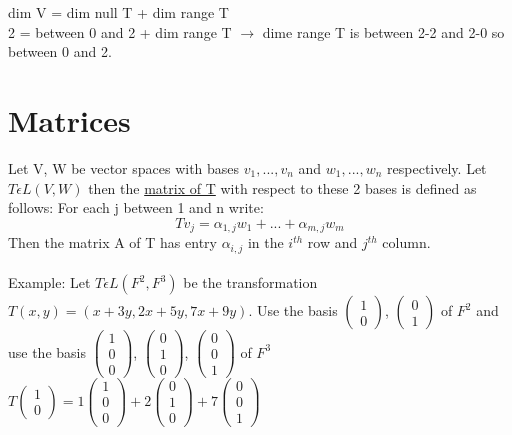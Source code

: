 \documentclass{article}
\begin{document}
dim V = dim null T + dim range T \\
2 = between 0 and 2 + dim range T $\rightarrow$ dime range T is between 2-2 and 2-0 so between 0 and 2.

\section{Matrices} 
Let V, W be vector spaces with bases $v_1, ..., v_n$ and $w_1, ..., w_n$ respectively. Let $T \epsilon L(V,W)$ then the \underline{matrix of T} with respect to these 2 bases is defined as follows: For each j between 1 and n write: $$Tv_j = \alpha_{1,j}w_1 + ... + \alpha_{m,j}w_m$$ Then the matrix A of T has entry $\alpha_{i,j}$ in the $i^{th}$ row and $j^{th}$ column. \\\\
Example: Let $T\epsilon L(F^2, F^3)$ be the transformation $T(x,y) = (x+3y, 2x + 5y, 7x + 9y)$. Use the basis $\begin{pmatrix} 1 \\ 0 \end{pmatrix}$, $\begin{pmatrix} 0 \\ 1 \end{pmatrix}$ of $F^2$ and use the basis $\begin{pmatrix} 1 \\ 0 \\ 0 \end{pmatrix}$, $\begin{pmatrix} 0 \\ 1\\ 0 \end{pmatrix}$, $\begin{pmatrix} 0 \\ 0\\1 \end{pmatrix}$ of $F^3$\\
$T\begin{pmatrix} 1 \\ 0 \end{pmatrix} = 1 \begin{pmatrix} 1 \\ 0 \\ 0 \end{pmatrix} + 2 \begin{pmatrix} 0 \\ 1\\0 \end{pmatrix} + 7 \begin{pmatrix} 0 \\ 0\\1 \end{pmatrix}$\\
\end{document}
